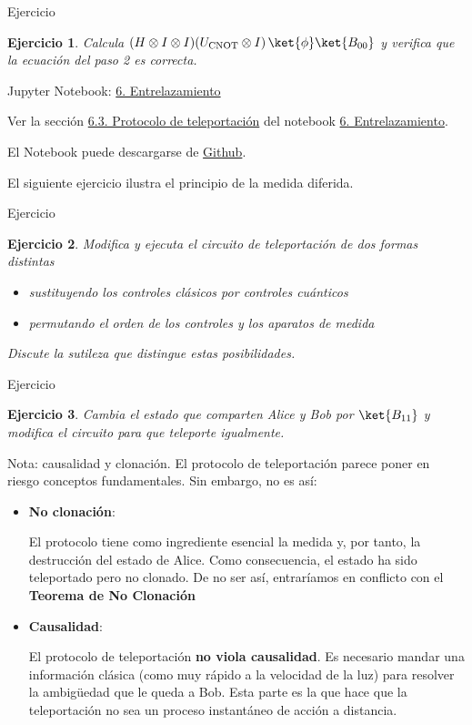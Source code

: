 \documentclass[a4paper,11pt]{book} %
\newtheorem{ejercicio_contador}{Ejercicio}
\newcommand{\Ejercicio}[1]{
		\begin{mybox_gray}{Ejercicio} 
			\begin{ejercicio_contador}
				 #1 
			\end{ejercicio_contador} 
		\end{mybox_gray}
	}
\numberwithin{equation}{chapter}
\begin{document}
	\Ejercicio{
	Calcula $(H \otimes I\otimes I)(U_{\rm CNOT}\otimes I)\, \ket{\phi}\ket{B_{00}}$ y verifica que la ecuación del paso 2 es correcta.
	}

	\begin{mybox_orange}{Jupyter Notebook: \href{https://www.scbi.uma.es/web/wp-content/uploads/Jupyterbook/CICC_UMA/Notebooks/html/docs/Part_01/Chapter_06-Entrelazamiento_myst.html}{6. Entrelazamiento}}
	
	Ver la sección \href{https://www.scbi.uma.es/web/wp-content/uploads/Jupyterbook/CICC_UMA/Notebooks/html/docs/Part_01/Chapter_06-Entrelazamiento_myst.html#protocolo-de-teleportacion}{6.3. Protocolo de teleportación} del notebook \href{https://www.scbi.uma.es/web/wp-content/uploads/Jupyterbook/CICC_UMA/Notebooks/html/docs/Part_01/Chapter_06-Entrelazamiento_myst.html}{6. Entrelazamiento}.
	
	El Notebook puede descargarse de \href{https://github.com/davidcb98/CICC_UMA/blob/master/Notebooks/Part_01/Chapter_06-Entrelazamiento.ipynb}{Github}.
	\end{mybox_orange}	
	
	
El siguiente ejercicio ilustra el principio de la medida diferida.	
	
	\Ejercicio{
	Modifica y ejecuta  el circuito de teleportación de dos formas distintas
	\begin{itemize}
		\item[a)] sustituyendo los controles clásicos por controles cuánticos
		\item[b)] permutando el orden de los controles y los aparatos de medida
	\end{itemize}
	Discute la sutileza que distingue estas posibilidades. 
	}
	
	\Ejercicio{
	Cambia el estado que comparten Alice y Bob por $\ket{B_{11}}$ y modifica el circuito para que teleporte igualmente.
	}

	\begin{mybox_blue}{Nota: causalidad y clonación.}
	El protocolo de teleportación parece poner en riesgo conceptos fundamentales. Sin embargo,
	no es así:
	\begin{itemize}
		\item \textbf{No clonación}: 
		
		El protocolo tiene como ingrediente esencial la medida y, por tanto, la 
		destrucción del estado de Alice. Como consecuencia, el estado ha sido teleportado
		pero no clonado.  De no ser así, entraríamos en conflicto con el  
		\textbf{Teorema de No Clonación}
		
		\item \textbf{Causalidad}: 
		
		El protocolo de teleportación \textbf{no viola causalidad}. Es necesario mandar 
		una información clásica (como muy rápido a la velocidad de la luz) para resolver la
		ambigüedad que le queda a Bob. Esta parte es la que hace que la teleportación no sea
		un proceso instantáneo de acción a distancia.    
    
	\end{itemize}
	\end{mybox_blue}
\end{document}
